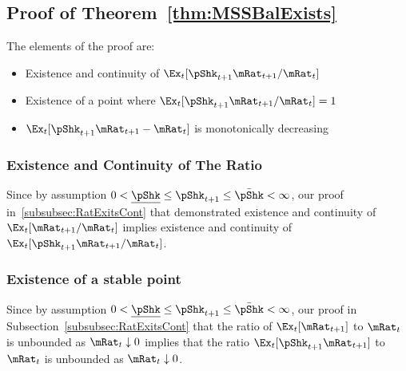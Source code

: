 \documentclass[\econtexRoot/BufferStockTheory]{subfiles}
\begin{document}
  
\subsection{Proof of Theorem~\ref{thm:MSSBalExists}}

The elements of the proof are:
\begin{itemize}
\item Existence and continuity of $\Ex_{t}[\pShk_{t+1}\mRat_{t+1}/\mRat_t]$
\item Existence of a point where $\Ex_{t}[\pShk_{t+1}\mRat_{t+1}/\mRat_t] = 1$
\item $\Ex_{t}[\pShk_{t+1}\mRat_{t+1}-\mRat_{t}]$ is monotonically decreasing
\end{itemize}

\subsubsection{Existence and Continuity of The Ratio}%

Since by assumption $ 0 < \underline{\pShk} \leq \pShk_{t+1} \leq \bar{\pShk} < \infty$, our proof in~\ref{subsubsec:RatExitsCont} that demonstrated existence and continuity of $\Ex_{t}[\mRat_{t+1}/\mRat_{t}]$ implies existence and continuity of $\Ex_{t}[\pShk_{t+1}\mRat_{t+1}/\mRat_{t}]$.

\subsubsection{Existence of a stable point}

Since by assumption $ 0 < \underline{\pShk} \leq \pShk_{t+1} \leq \bar{\pShk} < \infty$, our proof in Subsection~\ref{subsubsec:RatExitsCont} that the ratio of $\Ex_{t}[\mRat_{t+1}]$ to $\mRat_{t}$ is unbounded as $\mRat_{t} \downarrow 0$ implies that the ratio $\Ex_{t}[\pShk_{t+1}\mRat_{t+1}]$ to $\mRat_{t}$ is unbounded as $\mRat_{t} \downarrow 0$.
\end{document}
